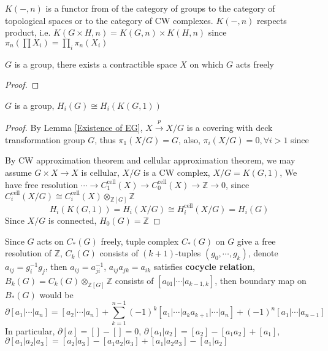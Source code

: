 \documentclass[../main.tex]{subfiles}
\begin{document}
\begin{theorem}
$K(-,n)$ is a functor from of the category of groups to the category of topological spaces or to the category of CW complexes. $K(-,n)$ respects product, i.e. $K(G\times H,n)=K(G,n)\times K(H,n)$ since $\pi_n(\prod X_i)=\prod_i\pi_n(X_i)$
\end{theorem}

\begin{lemma}\label{Existence of EG}
$G$ is a group, there exists a contractible space $X$ on which $G$ acts freely
\end{lemma}

\begin{proof}

\end{proof}

\begin{theorem}
$G$ is a group, $H_i(G)\cong H_i(K(G,1))$
\end{theorem}

\begin{proof}
By Lemma \ref{Existence of EG}, $X\xrightarrow{p}X/G$ is a covering with deck transformation group $G$, thus $\pi_1(X/G)=G$, also, $\pi_i(X/G)=0,\forall i>1$ since
\begin{center}
\end{center}
By CW approximation theorem and cellular approximation theorem, we may assume $G\times X\to X$ is cellular, $X/G$ is a CW complex, $X/G=K(G,1)$, We have free resolution $\cdots\to C^{\mathrm{cell}}_1(X)\to C^{\mathrm{cell}}_0(X)\to\mathbb Z\to0$, since $C^{\mathrm{cell}}_i(X/G)\cong C^{\mathrm{cell}}_i(X)\otimes_{\mathbb Z[G]}\mathbb Z$
\[H_i(K(G,1))=H_i(X/G)\cong H^{\mathrm{cell}}_i(X/G)=H_i(G)\]
Since $X/G$ is connected, $H_0(G)=\mathbb Z$
\end{proof}

\begin{remark}
Since $G$ acts on $C_*(G)$ freely, tuple complex $C_*(G)$ on $G$ give a free resolution of $\mathbb Z$, $C_k(G)$ consists of $(k+1)$-tuples $(g_0,\cdots,g_k)$, denote $a_{ij}=g_i^{-1}g_j$, then $a_{ij}=a_{ji}^{-1}$, $a_{ij}a_{jk}=a_{ik}$ satisfies \textbf{cocycle relation}, $B_k(G)=C_k(G)\otimes_{\mathbb Z[G]}\mathbb Z$ consists of $[a_{01}|\cdots|a_{k-1,k}]$, then boundary map on $B_*(G)$ would be 
\[\partial[a_1|\cdots|a_n]=[a_2|\cdots|a_n]+\sum_{k=1}^{n-1}(-1)^k[a_1|\cdots|a_ka_{k+1}|\cdots|a_n]+(-1)^n[a_1|\cdots|a_{n-1}]\]
In particular, $\partial[a]=[]-[]=0$, $\partial[a_1|a_2]=[a_2]-[a_1a_2]+[a_1]$, $\partial[a_1|a_2|a_3]=[a_2|a_3]-[a_1a_2|a_3]+[a_1|a_2a_3]-[a_1|a_2]$
\end{remark}
\end{document}
